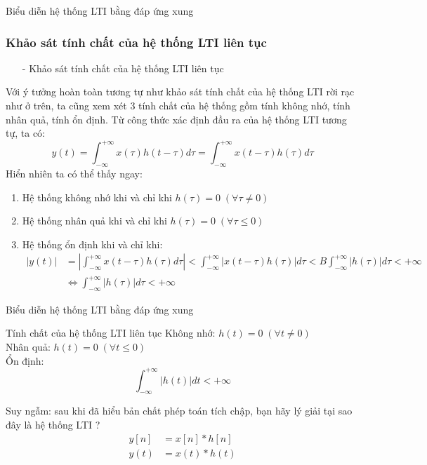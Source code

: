 \documentclass[8pt]{beamer}
\begin{document}
\begin{frame}{Biểu diễn hệ thống LTI bằng đáp ứng xung}
\subsubsection{Khảo sát tính chất của hệ thống LTI liên tục}
\begin{itemize}
	\item[-] Khảo sát tính chất của hệ thống LTI liên tục
\end{itemize}
	Với ý tưởng hoàn toàn tương tự như khảo sát tính chất của hệ thống LTI rời rạc như ở trên, ta cũng xem xét $3$ tính chất của hệ thống gồm \alert{tính không nhớ}, \alert{tính nhân quả}, \alert{tính ổn định}. Từ công thức xác định đầu ra của hệ thống LTI tương tự, ta có:
	$$y(t)=\int_{-\infty}^{+\infty}x(\tau)h(t-\tau)d\tau=\int_{-\infty}^{+\infty}x(t-\tau)h(\tau)d\tau$$
Hiển nhiên ta có thể thấy ngay:
\begin{enumerate}
	\item Hệ thống không nhớ khi và chỉ khi $h(\tau)=0\;(\forall \tau\neq 0)$
	\item Hệ thống nhân quả khi và chỉ khi $h(\tau)=0\;(\forall \tau\leq0)$
	\item Hệ thống ổn định khi và chỉ khi:
\begin{equation*}
\begin{split}
	|y(t)|&=\left|\int_{-\infty}^{+\infty}x(t-\tau)h(\tau)d\tau\right|<\int_{-\infty}^{+\infty}|x(t-\tau)h(\tau)|d\tau<B\int_{-\infty}^{+\infty}|h(\tau)|d\tau<+\infty\\
&\Leftrightarrow \int_{-\infty}^{+\infty}|h(\tau)|d\tau<+\infty
\end{split}
\end{equation*}
\end{enumerate}
\end{frame}
\begin{frame}{Biểu diễn hệ thống LTI bằng đáp ứng xung}
	\begin{block}{Tính chất của hệ thống LTI liên tục}
		Không nhớ: $h(t)=0\;(\forall t\neq 0)$\\

		Nhân quả: $h(t)=0\;(\forall t\leq 0)$\\

		Ổn định:
$$\int_{-\infty}^{+\infty}|h(t)|dt<+\infty$$
	\end{block}
Suy ngẫm: sau khi đã hiểu bản chất phép toán tích chập, bạn hãy lý giải tại sao đây là hệ thống LTI ?
\begin{equation*}
	\begin{split}
		y[n]&=x[n]*h[n]\\
		y(t)&=x(t)*h(t)\\
	\end{split}
\end{equation*}
\end{frame}
\end{document}
